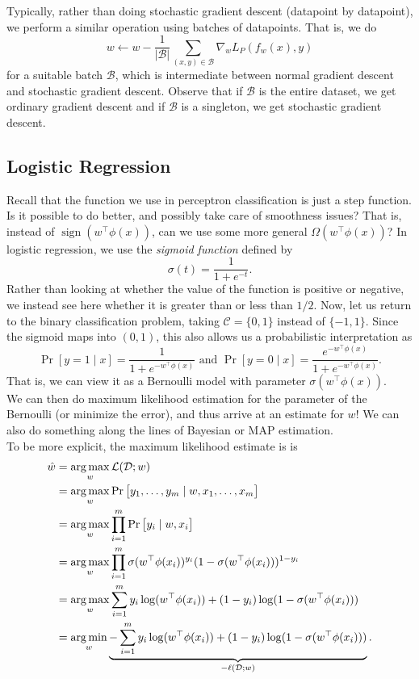 \documentclass{article}
\begin{document}
			Typically, rather than doing stochastic gradient descent (datapoint by datapoint), we perform a similar operation using batches of datapoints. That is, we do
			\[ w \gets w - \frac{1}{|\mathcal{B}|} \sum_{(x,y) \in \mathcal{B}} \nabla_w L_P(f_w(x),y) \]
			for a suitable batch $\mathcal{B}$, which is intermediate between normal gradient descent and stochastic gradient descent. Observe that if $\mathcal{B}$ is the entire dataset, we get ordinary gradient descent and if $\mathcal{B}$ is a singleton, we get stochastic gradient descent.

	\subsection{Logistic Regression}

		Recall that the function we use in perceptron classification is just a step function. Is it possible to do better, and possibly take care of smoothness issues? That is, instead of $\operatorname{sign}(w^\top\phi(x))$, can we use some more general $\Omega(w^\top \phi(x))$? In logistic regression, we use the \textit{sigmoid function} defined by
		\[ \sigma(t) = \frac{1}{1+e^{-t}}. \]
		Rather than looking at whether the value of the function is positive or negative, we instead see here whether it is greater than or less than $1/2$. Now, let us return to the binary classification problem, taking $\mathcal{C} = \{0,1\}$ instead of $\{-1,1\}$. Since the sigmoid maps into $(0,1)$, this also allows us a probabilistic interpretation as
		\[ \Pr[y=1 \mid x] = \frac{1}{1+e^{-w^\top \phi(x)}} \text{ and } \Pr[y=0\mid x] = \frac{e^{-w^\top \phi(x)}}{1+e^{-w^\top \phi(x)}}. \]
		That is, we can view it as a Bernoulli model with parameter $\sigma(w^\top\phi(x))$.\\
		We can then do maximum likelihood estimation for the parameter of the Bernoulli (or minimize the error), and thus arrive at an estimate for $w$! We can also do something along the lines of Bayesian or MAP estimation.\\
		To be more explicit, the maximum likelihood estimate is is
		\begin{align*}
			\hat{w} &= \operatorname*{arg\,max}_w \mathcal{L}(\mathcal{D};w) \\
				&= \operatorname*{arg\,max}_w \Pr\left[ y_1,\ldots,y_m \mid w,x_1,\ldots,x_m \right] \\
				&= \operatorname*{arg\,max}_w \prod_{i=1}^m \Pr\left[ y_i \mid w, x_i \right] \\
				&= \operatorname*{arg\,max}_w \prod_{i=1}^m \sigma(w^\top\phi(x_i))^{y_i} (1 - \sigma(w^\top\phi(x_i)))^{1-y_i} \\
				&= \operatorname*{arg\,max}_w \sum_{i=1}^m y_i \log(w^\top \phi(x_i)) + (1 - y_i) \log(1-\sigma(w^\top\phi(x_i))) \\
				&= \operatorname*{arg\,min}_w \underbrace{- \sum_{i=1}^m y_i \log(w^\top \phi(x_i)) + (1 - y_i) \log(1-\sigma(w^\top\phi(x_i)))}_{-\ell(\mathcal{D};w)}.
		\end{align*}
\end{document}
